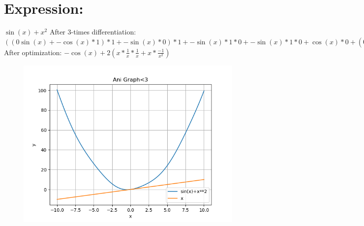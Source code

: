 \documentclass{article}
\begin{document}
\section{Expression:}
$\sin(x)+{x}^{2}$\newline\newline
After 3-times differentiation:\newline
$((0\sin(x)+-\cos(x)*1)*1+-\sin(x)*0)*1+-\sin(x)*1*0+-\sin(x)*1*0+\cos(x)*0+(0{x}^{2-1}+0{x}^{2-1}*(\ln(x)*(0-0)+\frac{1}{x}*1*(2-1))+0{x}^{2-1}*(\ln(x)*(0-0)+\frac{1}{x}*1*(2-1))+2({x}^{2-1}*(\ln(x)*(0-0)+\frac{1}{x}*1*(2-1))*(\ln(x)*(0-0)+\frac{1}{x}*1*(2-1))+{x}^{2-1}*(\frac{1}{x}*1*(0-0)+\ln(x)*(0-0)+(\frac{0x-11}{x*x}*1+\frac{1}{x}*0)*(2-1)+\frac{1}{x}*1*(0-0))))*1+(0{x}^{2-1}+2{x}^{2-1}*(\ln(x)*(0-0)+\frac{1}{x}*1*(2-1)))*0+(0{x}^{2-1}+2{x}^{2-1}*(\ln(x)*(0-0)+\frac{1}{x}*1*(2-1)))*0+2{x}^{2-1}*0$\newline\newline
After optimization:\newline
$-\cos(x)+2(x*\frac{1}{x}*\frac{1}{x}+x*\frac{-1}{{x}^{2}})$\newline\newline
\begin{figure} [!ht]
\begin{flushleft}
\includegraphics[scale = 0.700000]{figs/fig2.png}
\end{flushleft}
\end{figure}
\newpage
\end{document}
